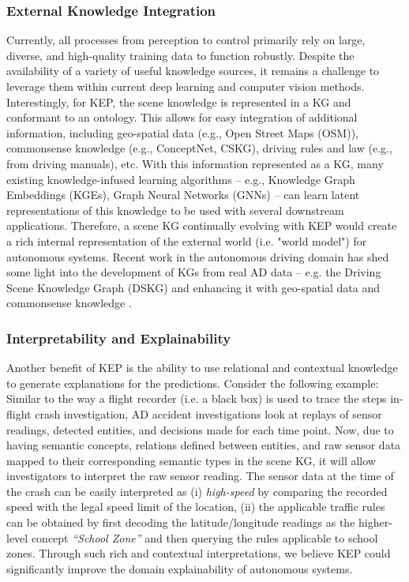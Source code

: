 \documentclass[conference]{IEEEtran}
\begin{document}
\subsubsection{\textbf{External Knowledge Integration}}
Currently, all processes from perception to control primarily rely on large, diverse, and high-quality training data to function robustly. Despite the availability of a variety of useful knowledge sources, it remains a challenge to leverage them within current deep learning and computer vision methods. Interestingly, for KEP, the scene knowledge is represented in a KG and conformant to an ontology. This allows for easy integration of additional information, including geo-spatial data (e.g., Open Street Maps (OSM)), commonsense knowledge (e.g., ConceptNet, CSKG\cite{filip2021cskg}), driving rules and law (e.g., from driving manuals), etc. With this information represented as a KG, many existing knowledge-infused learning \cite{shadesof,valiant2006knowledge, garcez2020neurosymbolic} algorithms -- e.g., Knowledge Graph Embeddings (KGEs)\cite{rossi2021knowledge}, Graph Neural Networks (GNNs)\cite{wu2020comprehensive} -- can learn latent representations of this knowledge to be used with several downstream applications. Therefore, a scene KG continually evolving with KEP would create a rich internal representation of the external world (i.e. "world model") for autonomous systems. Recent work in the autonomous driving domain has shed some light into the development of KGs from real AD data -- e.g. the Driving Scene Knowledge Graph (DSKG) and enhancing it with geo-spatial data \cite{wickramarachchi2021knowledge} and commonsense knowledge \cite{chowdhury2021towards}.\\ 


\subsubsection{\textbf{Interpretability and Explainability}} Another benefit of KEP is the ability to use relational and contextual knowledge to generate explanations for the predictions. Consider the following example: Similar to the way a flight recorder (i.e. a black box) is used to trace the steps in-flight crash investigation, AD accident investigations look at replays of sensor readings, detected entities, and decisions made for each time point. Now, due to having semantic concepts, relations defined between entities, and raw sensor data mapped to their corresponding semantic types in the scene KG, it will allow investigators to interpret the raw sensor reading. The sensor data at the time of the crash can be easily interpreted as (i) \textit{high-speed} by comparing the recorded speed with the legal speed limit of the location, (ii) the applicable traffic rules can be obtained by first decoding the latitude/longitude readings as the higher-level concept \textit{``School Zone''} and then querying the rules applicable to school zones. Through such rich and contextual interpretations, we believe KEP could significantly improve the domain explainability of autonomous systems.
\end{document}
